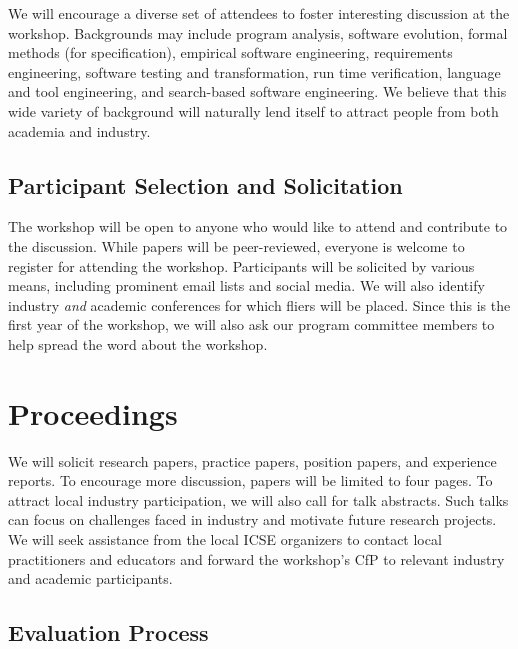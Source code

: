 \documentclass[10pt, conference]{IEEEtran}
\begin{document}
We will encourage a diverse set of attendees to foster interesting discussion at the workshop. Backgrounds may include program analysis, software evolution, formal methods (for specification), empirical software engineering, requirements engineering, software testing and transformation, run time verification, language and tool engineering, and search-based software engineering. We believe that this wide variety of background will naturally lend itself to attract people from both academia and industry.

\subsection{Participant Selection and Solicitation}

The workshop will be open to anyone who would like to attend and contribute to the discussion. While papers will be peer-reviewed, everyone is welcome to register for attending the workshop. Participants will be solicited by various means, including prominent email lists and social media. We will also identify industry \emph{and} academic conferences for which fliers will be placed. Since this is the first year of the workshop, we will also ask our program committee members to help spread the word about the workshop.

\section{Proceedings}

We will solicit research papers, practice papers, position papers, and experience reports. To encourage more discussion, papers will be limited to four pages. To attract local industry participation, we will also call for talk abstracts. Such talks can focus on challenges faced in industry and motivate future research projects. We will seek assistance from the local ICSE organizers to contact local practitioners and educators and forward the workshop's CfP to relevant industry and academic participants.

\subsection{Evaluation Process}
\end{document}
